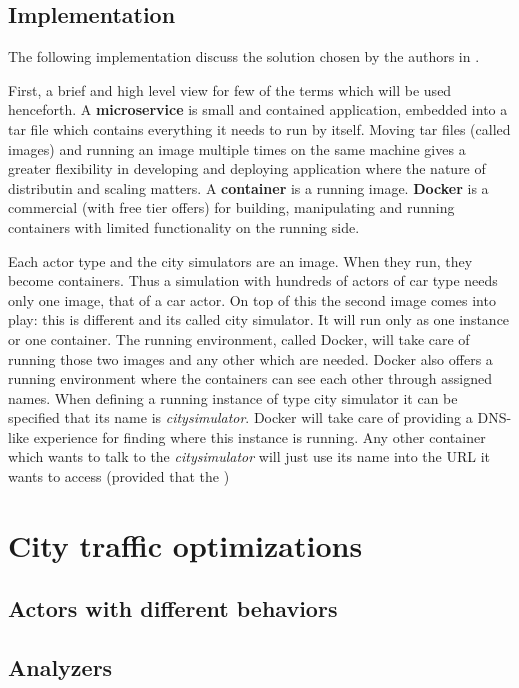 \documentclass[a4paper,12pt,twoside]{book}
\begin{document}
\subsection{Implementation}

The following implementation discuss the solution chosen by the authors in \cite{microservicestrafficsimulation}.

First, a brief and high level view for few of the terms which will be used henceforth. A \textbf{microservice} is small and contained application, embedded into a tar file which contains everything it needs to run by itself. Moving tar files (called images) and running an image multiple times on the same machine gives a greater flexibility in developing and deploying application where the nature of distributin and scaling matters. A \textbf{container} is a running image. \textbf{Docker} \citep{docker} is a commercial (with free tier offers) for building, manipulating and running containers with limited functionality on the running side.

Each actor type and the city simulators are an image. When they run, they become containers. Thus a simulation with hundreds of actors of car type needs only one image, that of a car actor. On top of this the second image comes into play: this is different and its called city simulator. It will run only as one instance or one container. The running environment, called Docker, will take care of running those two images and any other which are needed. Docker also offers a running environment where the containers can see each other through assigned names. When defining a running instance of type city simulator it can be specified that its name is \textit{citysimulator}. Docker will take care of providing a DNS-like experience for finding where this instance is running. Any other container which wants to talk to the \textit{citysimulator} will just use its name into the URL it wants to access (provided that the )

\section{City traffic optimizations}
\label{sec:citytrafficoptimizations}

\subsection{Actors with different behaviors}
\label{subsec:actordiffbehaviors}

\subsection{Analyzers}


\end{document}
